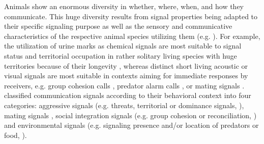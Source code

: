 Animals show an enormous diversity in whether, where, when, and how they communicate. This huge diversity results from signal properties being adapted to their specific signaling purpose as well as the sensory and communicative characteristics of the respective animal species utilizing them (e.g. \citealp{Fernald2014}). For example, the utilization of urine marks as chemical signals are most suitable to signal status and territorial occupation in rather solitary living species with huge territories because of their longevity  \citep{Cornhill2020}, whereas distinct short living acoustic or visual signals are most suitable in contexts aiming for immediate responses by receivers, e.g. group cohesion calls \citep{Demartsev2018}, predator alarm calls \citep{Schibler2007}, or mating signals \citep{Ligon2018}. \citet{Bandbury2011} classified communication signals according to their behavioral context into four categories: aggressive signals (e.g. threats, territorial or dominance signals, \citealp{Cluttonbrock1979, Kappeler2008, Fernald2014, Bolt2019, Kareklas2019, Cornhill2020}), mating signals \citep{Ritschard2010, Henninger2018, Ligon2018}, social integration signals (e.g. group cohesion or reconciliation, \citealp{Cheney1995, Schamberg2016, Demartsev2018}) and environmental signals (e.g. signaling presence and/or location of predators or food, \citealp{Seyfarth1980, Seeley1997, Schibler2007}). 


